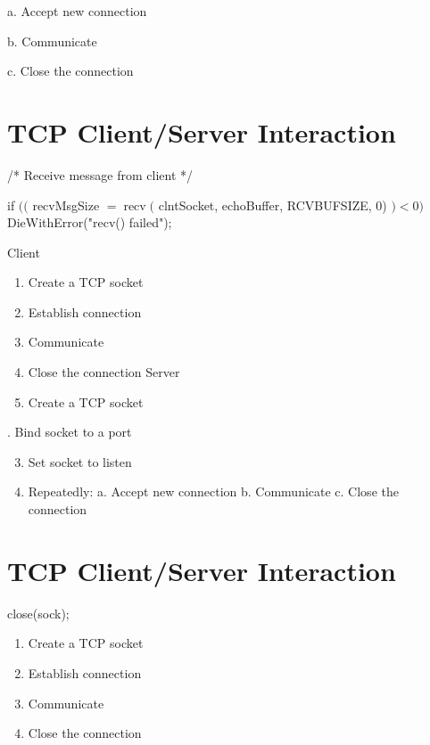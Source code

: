 \documentclass[10pt]{article}
\begin{document}
a. Accept new connection

b. Communicate

c. Close the connection

\section{TCP Client/Server Interaction}
/* Receive message from client */

if $(($ recvMsgSize $=\operatorname{recv}($ clntSocket, echoBuffer, RCVBUFSIZE, 0) $)<0)$ DieWithError("recv() failed");

Client

\begin{enumerate}
  \item Create a TCP socket

  \item Establish connection

  \item Communicate

  \item Close the connection Server

  \item Create a TCP socket

\end{enumerate}

. Bind socket to a port

\begin{enumerate}
  \setcounter{enumi}{2}
  \item Set socket to listen

  \item Repeatedly:
a. Accept new connection
b. Communicate
c. Close the connection

\end{enumerate}

\section{TCP Client/Server Interaction}
close(sock);



\begin{enumerate}
  \item Create a TCP socket

  \item Establish connection

  \item Communicate

  \item Close the connection

\end{enumerate}
\end{document}
